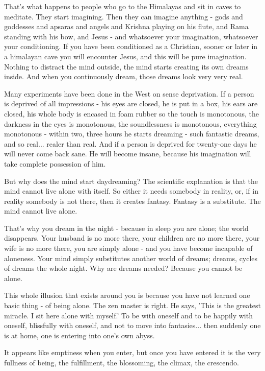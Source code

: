That's what happens to people who go to the Himalayas and sit in caves to meditate. They start imagining. Then they can imagine anything - gods and goddesses and apsaras and angels and Krishna playing on his flute, and Rama standing with his bow, and Jesus - and whatsoever your imagination, whatsoever your conditioning. If you have been conditioned as a Christian, sooner or later in a himalayan cave you will encounter Jesus, and this will be pure imagination. Nothing to distract the mind outside, the mind starts creating its own dreams inside. And when you continuously dream, those dreams look very very real.

Many experiments have been done in the West on sense deprivation. If a person is deprived of all impressions - his eyes are closed, he is put in a box, his ears are closed, his whole body is encased in foam rubber so the touch is monotonous, the darkness in the eyes is monotonous, the soundlessness is monotonous, everything monotonous - within two, three hours he starts dreaming - such fantastic dreams, and so real... realer than real. And if a person is deprived for twenty-one days he will never come back sane. He will become insane, because his imagination will take complete possession of him.

But why does the mind start daydreaming? The scientific explanation is that the mind cannot live alone with itself. So either it needs somebody in reality, or, if in reality somebody is not there, then it creates fantasy. Fantasy is a substitute. The mind cannot live alone.

That's why you dream in the night - because in sleep you are alone; the world disappears. Your husband is no more there, your children are no more there, your wife is no more there, you are simply alone - and you have become incapable of aloneness. Your mind simply substitutes another world of dreams; dreams, cycles of dreams the whole night. Why are dreams needed? Because you cannot be alone.

This whole illusion that exists around you is because you have not learned one basic thing - of being alone. The zen master is right. He says, 'This is the greatest miracle. I sit here alone with myself.' To be with oneself and to be happily with oneself, blissfully with oneself, and not to move into fantasies... then suddenly one is at home, one is entering into one's own abyss.

It appears like emptiness when you enter, but once you have entered it is the very fullness of being, the fulfillment, the blossoming, the climax, the crescendo.

